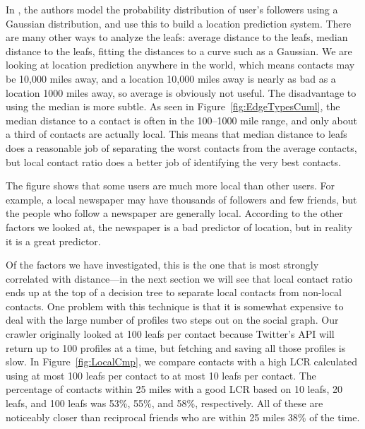 In \cite{li2012towards}, the authors model the probability distribution of
user's followers using a Gaussian distribution, and use this to build a
location prediction system.
%
There are many other ways to analyze the leafs: average distance to the leafs,
median distance to the leafs, fitting the distances to a curve such as a
Gaussian.
%
We are looking at location prediction anywhere in the world, which means
contacts may be 10,000 miles away, and a location 10,000 miles away is nearly
as bad as a location 1000 miles away, so average is obviously not useful.
%
The disadvantage to using the median is more subtle.
%
As seen in Figure~\ref{fig:EdgeTypesCuml}, the median distance to a contact is
often in the 100--1000 mile range, and only about a third of contacts are
actually local.
%
This means that median distance to leafs does a reasonable job of separating the
worst contacts from the average contacts, but local contact ratio does a better
job of identifying the very best contacts.

The figure shows that some users are much more local than other users.
For example, a local newspaper may have thousands of followers and few friends,
but the people who follow a newspaper are generally local.
According to the other factors we looked at, the newspaper is a bad predictor
of location, but in reality it is a great predictor.

Of the factors we have investigated, this is the one that is most strongly
correlated with distance---in the next section we will see that local contact
ratio ends up at the top of a decision tree to separate local contacts from
non-local contacts.
%
One problem with this technique is that it is somewhat expensive to deal with
the large number of profiles two steps out on the social graph.
%
Our crawler originally looked at 100 leafs per contact because Twitter's API
will return up to 100 profiles at a time, but fetching and saving all those
profiles is slow.
%
In Figure~\ref{fig:LocalCmp}, we compare contacts with a high LCR calculated
using at most 100 leafs per contact to at most 10 leafs per contact.
%
The percentage of contacts within 25 miles with a good LCR based on 10 leafs,
20 leafs, and 100 leafs was 53\%, 55\%, and 58\%, respectively.
%
All of these are noticeably closer than reciprocal friends who are within 25
miles 38\% of the time.

